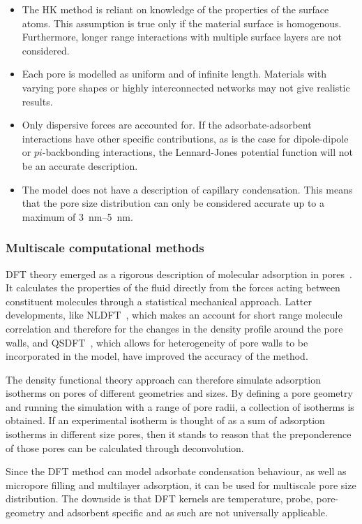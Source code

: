 \begin{itemize}

	\item The \gls{HK} method is reliant on knowledge of the properties of
	      the surface atoms. This assumption is true only if the
	      material surface is homogenous. Furthermore,
	      longer range interactions with multiple surface layers are
	      not considered.
	\item Each pore is modelled as uniform and of infinite length.
	      Materials with varying pore shapes or highly interconnected
	      networks may not give realistic results.
	\item Only dispersive forces are accounted for.
	      If the adsorbate-adsorbent interactions
	      have other specific contributions, as is the case
	      for dipole-dipole or \(pi\)-backbonding interactions,
	      the Lennard-Jones potential function will not be
	      an accurate description.
	\item The model does not have a description of capillary condensation.
	      This means that the pore size distribution can only
	      be considered accurate up to a maximum of
	      \SIrange{3}{5}{\nano\metre}.

\end{itemize}

\subsubsection{Multiscale computational methods}

\gls{DFT} theory emerged as a rigorous description of molecular
adsorption in pores~\cite{seatonNewAnalysisMethod1989}.
It calculates the properties of the fluid
directly from the forces acting between constituent molecules
through a statistical mechanical approach. Latter developments,
like \gls{NLDFT}~\cite{tarazonaPhaseEquilibriaFluid1987},
which makes an account for short range molecule correlation
and therefore for the changes in the density profile
around the pore walls, and \gls{QSDFT}~\cite{neimarkQuenchedSolidDensity2009}, 
which allows for heterogeneity of pore walls to be incorporated in the model,
have improved the accuracy of the method.

The density functional theory approach can therefore simulate
adsorption isotherms on pores of different geometries and sizes.
By defining a pore geometry and running the simulation with a
range of pore radii, a collection of isotherms is obtained.
If an experimental isotherm is thought of as a sum of
adsorption isotherms in different size pores, then it stands
to reason that the preponderence of those pores can be calculated
through deconvolution.

Since the \gls{DFT} method can model adsorbate condensation behaviour,
as well as micropore filling and multilayer adsorption, it can
be used for multiscale pore size distribution. The downside is
that \gls{DFT} kernels are temperature, probe, pore-geometry and
adsorbent specific and as such are not universally applicable.
